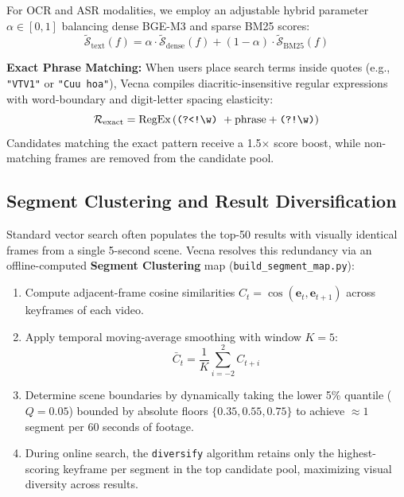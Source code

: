\documentclass[10pt,a4paper,twocolumn]{article}
\begin{document}
For OCR and ASR modalities, we employ an adjustable hybrid parameter $\alpha \in [0, 1]$ balancing dense BGE-M3 and sparse BM25 scores:
\begin{equation}
\tilde{\mathcal{S}}_{\text{text}}(f) = \alpha \cdot \tilde{\mathcal{S}}_{\text{dense}}(f) + (1 - \alpha) \cdot \tilde{\mathcal{S}}_{\text{BM25}}(f)
\end{equation}

\textbf{Exact Phrase Matching:} When users place search terms inside quotes (e.g., \texttt{"VTV1"} or \texttt{"Cuu hoa"}), Vecna compiles diacritic-insensitive regular expressions with word-boundary and digit-letter spacing elasticity:
\begin{equation}
\mathcal{R}_{\text{exact}} = \text{RegEx}\left(\verb|(?<!\w)|\ + \text{phrase} + \verb|(?!\w)|\right)
\end{equation}
Candidates matching the exact pattern receive a 1.5$\times$ score boost, while non-matching frames are removed from the candidate pool.

\subsection{Segment Clustering and Result Diversification}
Standard vector search often populates the top-50 results with visually identical frames from a single 5-second scene. Vecna resolves this redundancy via an offline-computed \textbf{Segment Clustering} map (\texttt{build\_segment\_map.py}):
\begin{enumerate}
    \item Compute adjacent-frame cosine similarities $C_t = \cos(\mathbf{e}_t, \mathbf{e}_{t+1})$ across keyframes of each video.
    \item Apply temporal moving-average smoothing with window $K = 5$:
    \begin{equation}
    \bar{C}_t = \frac{1}{K} \sum_{i=-2}^{2} C_{t+i}
    \end{equation}
    \item Determine scene boundaries by dynamically taking the lower 5\% quantile ($Q = 0.05$) bounded by absolute floors $\{0.35, 0.55, 0.75\}$ to achieve $\approx 1$ segment per 60 seconds of footage.
    \item During online search, the \texttt{diversify} algorithm retains only the highest-scoring keyframe per segment in the top candidate pool, maximizing visual diversity across results.
\end{enumerate}
\end{document}
